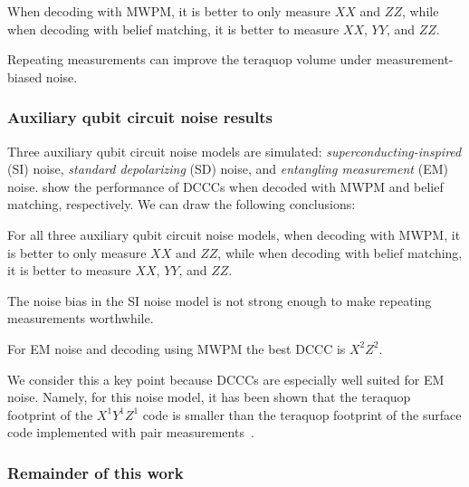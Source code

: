\begin{keypoint}
When decoding with MWPM, it is better to only measure $XX$ and $ZZ$, while when decoding with belief matching, it is better to measure $XX$, $YY$, and $ZZ$.
\end{keypoint}

\begin{keypoint}
Repeating measurements can improve the teraquop volume under measure\-ment-biased noise.
\end{keypoint}



\subsubsection{Auxiliary qubit circuit noise results}\label{subsubsec:auxiliary-qubit-circuit-noise-results}

Three auxiliary qubit circuit noise models are simulated: \emph{superconducting-inspired} (SI) noise, \emph{standard depolarizing} (SD) noise, and \emph{entangling
measurement} (EM) noise.
 show the performance of DCCCs when decoded with MWPM and belief matching, respectively. 
We can draw the following conclusions:

\begin{keypoint}
For all three auxiliary qubit circuit noise models, when decoding with MWPM, it is better to only measure $XX$ and $ZZ$, while when decoding with belief matching, it is better to measure $XX$, $YY$, and $ZZ$.
\end{keypoint}

\begin{keypoint}
The noise bias in the SI noise model is not strong enough to make repeating measurements worthwhile.
\end{keypoint}

\begin{keypoint}
For EM noise and decoding using MWPM the best DCCC is $X^2Z^2$.
\end{keypoint}

We consider this a key point because DCCCs are especially well suited for EM noise.
Namely, for this noise model, it has been shown that the teraquop footprint of the $X^1 Y^1 Z^1$ code is smaller than the teraquop footprint of the surface code implemented with pair measurements~\cite{gidney2023pair,paetznick2023performance}.

\subsubsection{Remainder of this work}\label{subsubsec:remainder-of-this-work}

